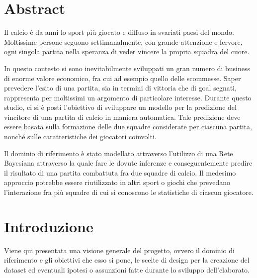 \documentclass[hidelinks, 12pt]{article}
\begin{document}

\tableofcontents
\pagebreak




\section{Abstract}

Il calcio è da anni lo sport più giocato e diffuso in svariati paesi del mondo. Moltissime persone seguono settimanalmente, con grande attenzione e fervore, ogni singola partita nella speranza di veder vincere la propria squadra del cuore.

In questo contesto si sono inevitabilmente sviluppati un gran numero di business di enorme valore economico, fra cui ad esempio quello delle scommesse. Saper prevedere l'esito di una partita, sia in termini di vittoria che di goal segnati, rappresenta per moltissimi un argomento di particolare interesse. Durante questo studio, ci si è posti l'obiettivo di sviluppare un modello per la predizione del vincitore di una partita di calcio in maniera automatica. Tale predizione deve essere basata sulla formazione delle due squadre considerate per ciascuna partita, nonché sulle caratteristiche dei giocatori coinvolti.

Il dominio di riferimento è stato modellato attraverso l'utilizzo di una Rete Bayesiana attraverso la quale fare le dovute inferenze e conseguentemente predire il risultato di una partita combattuta fra due squadre di calcio. Il medesimo approccio potrebbe essere riutilizzato in altri sport o giochi che prevedano l'interazione fra più squadre di cui si conoscono le statistiche di ciascun giocatore.



\clearpage



\section{Introduzione}

Viene qui presentata una visione generale del progetto, ovvero il dominio di riferimento e gli obiettivi che esso si pone, le scelte di design per la creazione del dataset ed eventuali ipotesi o assunzioni fatte durante lo sviluppo dell'elaborato.
\end{document}
